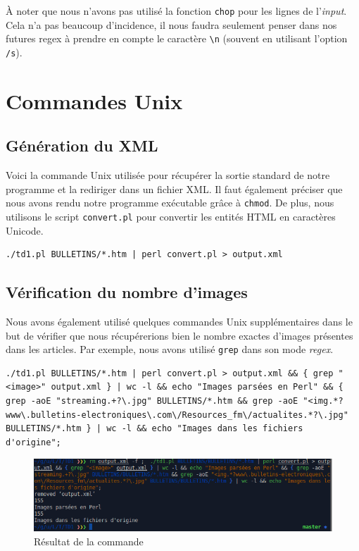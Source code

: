 À noter que nous n'avons pas utilisé la fonction \lstinline{chop} pour les lignes de l'\textit{input}. Cela n'a pas beaucoup d'incidence, il nous faudra seulement penser dans nos futures regex à prendre en compte le caractère \lstinline{\n} (souvent en utilisant l'option \lstinline{/s}).

\section{Commandes Unix}

\subsection{Génération du XML}
\fakeshell

Voici la commande Unix utilisée pour récupérer la sortie standard de notre programme et la rediriger dans un fichier XML. Il faut également préciser que nous avons rendu notre programme exécutable grâce à \lstinline{chmod}. De plus, nous utilisons le script \lstinline{convert.pl} pour convertir les entités HTML en caractères Unicode.

\begin{lstlisting}
./td1.pl BULLETINS/*.htm | perl convert.pl > output.xml
\end{lstlisting}

\subsection{Vérification du nombre d'images}

Nous avons également utilisé quelques commandes Unix supplémentaires dans le but de vérifier que nous récupérerions bien le nombre exactes d'images présentes dans les articles. Par exemple, nous avons utilisé \lstinline{grep} dans son mode \textit{regex}.

\begin{lstlisting}
./td1.pl BULLETINS/*.htm | perl convert.pl > output.xml && { grep "<image>" output.xml } | wc -l && echo "Images parsées en Perl" && { grep -aoE "streaming.+?\.jpg" BULLETINS/*.htm && grep -aoE "<img.*?www\.bulletins-electroniques\.com\/Resources_fm\/actualites.*?\.jpg" BULLETINS/*.htm } | wc -l && echo "Images dans les fichiers d'origine";
\end{lstlisting}

\begin{figure}[H]
  \centering\includegraphics[width=1.00\textwidth]{images/output_td1.png}
  \caption{Résultat de la commande}
\end{figure}

